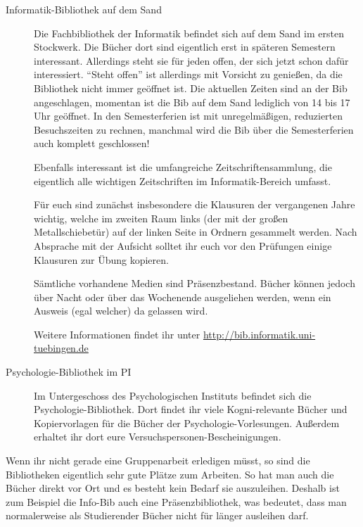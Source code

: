 \begin{description}
	\item[Informatik-Bibliothek auf dem Sand]
	Die Fachbibliothek der Informatik befindet sich auf dem Sand
	im ersten Stockwerk.  Die Bücher dort sind eigentlich erst in
	späteren Semestern interessant.  Allerdings steht sie für jeden
	offen, der sich jetzt schon dafür interessiert.  "`Steht
	offen"' ist allerdings mit Vorsicht zu genießen, da die
	Bibliothek nicht immer geöffnet ist. Die aktuellen Zeiten
	sind an der Bib angeschlagen, momentan ist die Bib auf dem Sand lediglich von 14 bis 17 Uhr geöffnet.
	In den Semesterferien ist mit unregelmäßigen, reduzierten Besuchszeiten zu rechnen, manchmal wird die Bib über die Semesterferien auch komplett geschlossen!
	
	Ebenfalls interessant ist die umfangreiche Zeitschriftensammlung,
	die eigentlich alle wichtigen Zeitschriften im
	Informatik-Bereich umfasst.
	
	Für euch sind zunächst insbesondere die Klausuren der
	vergangenen Jahre wichtig, welche im zweiten Raum links (der mit
	der großen Metallschiebetür) auf der linken Seite in Ordnern gesammelt
	werden.  Nach Absprache mit der Aufsicht solltet ihr euch vor den
	Prüfungen einige Klausuren zur Übung kopieren.
	
	Sämtliche vorhandene Medien sind Präsenzbestand. Bücher können
	jedoch über Nacht oder über das Wochenende ausgeliehen werden, wenn ein Ausweis	(egal welcher) da gelassen wird.
	
	Weitere Informationen findet ihr unter \url{http://bib.informatik.uni-tuebingen.de}
	
	\item[Psychologie-Bibliothek im PI]
Im Untergeschoss des Psychologischen Instituts befindet sich die Psychologie-Bibliothek. Dort findet ihr viele Kogni-relevante Bücher und Kopiervorlagen für die Bücher der Psychologie-Vorlesungen. Außerdem erhaltet ihr dort eure Versuchspersonen-Bescheinigungen.
	
\end{description}

Wenn ihr nicht gerade eine Gruppenarbeit erledigen müsst, so sind die
Bibliotheken eigentlich sehr gute Plätze zum Arbeiten.  So hat man
auch die Bücher direkt vor Ort und es besteht kein Bedarf sie
auszuleihen.  Deshalb ist zum Beispiel die Info-Bib auch eine
Präsenzbibliothek, was bedeutet, dass man normalerweise als
Studierender Bücher nicht für länger ausleihen darf.


